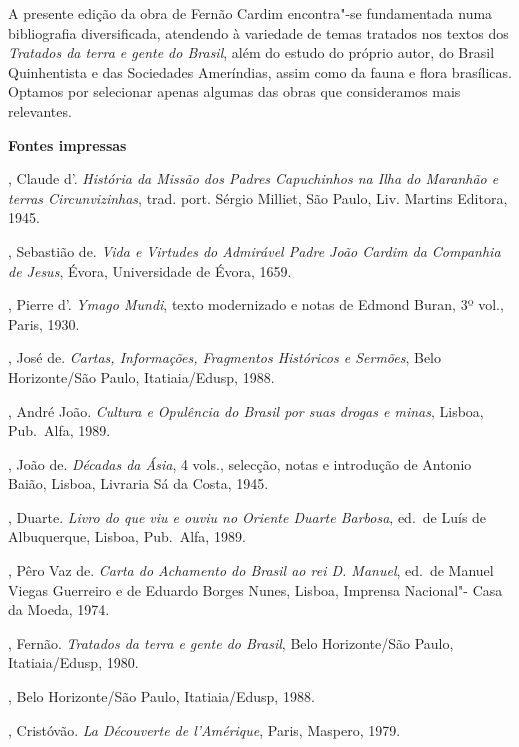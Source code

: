 \begin{bibliohedra} 
\item A presente edição da obra de Fernão Cardim encontra"-se fundamentada
numa bibliografia diversificada, atendendo à variedade de temas
tratados nos textos dos \textit{Tratados da terra e gente do Brasil}, 
além do estudo do próprio autor, do Brasil Quinhentista e das
Sociedades Ameríndias, assim como da fauna e flora brasílicas. Optamos
por selecionar apenas algumas das obras que consideramos mais relevantes.

\vspace*{2ex}
\scriptsize\textbf{Fontes impressas}

, Claude d'. \textit{História da Missão dos Padres
Capuchinhos na Ilha do Maranhão e terras Circunvizinhas}, trad. port.
Sérgio Milliet, São Paulo, Liv. Martins Editora, 1945.

, Sebastião de. \textit{Vida e Virtudes do Admirável Padre João
Cardim da Companhia de Jesus}, Évora, Universidade de Évora, 1659.

, Pierre d'. \textit{Ymago Mundi}, texto modernizado e notas de
Edmond Buran, 3º vol., Paris, 1930.

, José de. \textit{Cartas, Informações, Fragmentos Históricos
e Sermões}, Belo Horizonte/São Paulo, Itatiaia/Edusp, 1988.

, André João. \textit{Cultura e Opulência do Brasil por suas
drogas e minas}, Lisboa, Pub.~Alfa, 1989.

, João de. \textit{Décadas da Ásia}, 4 vols., selecção, notas e
introdução de Antonio Baião, Lisboa, Livraria Sá da Costa, 1945.

, Duarte. \textit{Livro do que viu e ouviu no Oriente Duarte
Barbosa}, ed.~de Luís de Albuquerque, Lisboa, Pub.~Alfa, 1989.

, Pêro Vaz de. \textit{Carta do Achamento do Brasil ao rei D.
Manuel}, ed.~de Manuel Viegas Guerreiro e de Eduardo Borges Nunes,
Lisboa, Imprensa Nacional"- Casa da Moeda, 1974.

, Fernão. \textit{Tratados da terra e gente do Brasil}, Belo
Horizonte/São Paulo, Itatiaia/Edusp, 1980.

, Belo
Horizonte/São Paulo, Itatiaia/Edusp, 1988.

, Cristóvão. \textit{La Découverte de l'Amérique}, Paris, Maspero, 1979.


\end{bibliohedra}
